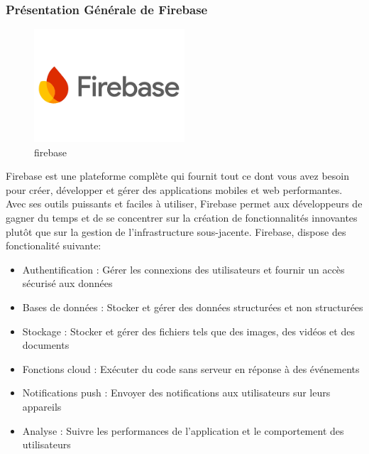 \documentclass[a4paper,12pt]{report}
\begin{document}
\subsubsection{Présentation Générale de Firebase}

\begin{figure}[h!]
  \centering
  \includegraphics[width=0.5\textwidth]{./images/firebase.png}
  \caption{firebase}
  \label{fig:Firebase}
\end{figure}

Firebase est une plateforme complète qui fournit tout ce dont vous avez besoin pour créer, développer et gérer des applications mobiles et web performantes.
Avec ses outils puissants et faciles à utiliser, Firebase permet aux développeurs de gagner du temps et de se concentrer sur la création de fonctionnalités innovantes plutôt que sur la gestion de l'infrastructure sous-jacente. Firebase, dispose des fonctionalité suivante:
\begin{itemize}
  \item Authentification : Gérer les connexions des utilisateurs et fournir un accès sécurisé aux données
  \item Bases de données : Stocker et gérer des données structurées et non structurées
  \item Stockage : Stocker et gérer des fichiers tels que des images, des vidéos et des documents
  \item Fonctions cloud : Exécuter du code sans serveur en réponse à des événements
  \item Notifications push : Envoyer des notifications aux utilisateurs sur leurs appareils
  \item Analyse : Suivre les performances de l'application et le comportement des utilisateurs
\end{itemize}
\end{document}
